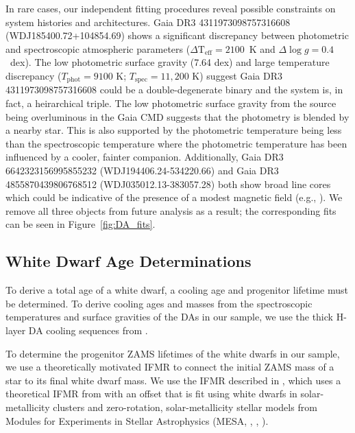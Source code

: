 \documentclass[twocolumn]{aastex631}
\newcommand{\logg}{$\log{g}$}
\begin{document}
In rare cases, our independent fitting procedures reveal possible constraints on system histories and architectures. Gaia DR3 4311973098757316608 (WDJ185400.72+104854.69) shows a significant discrepancy between photometric and spectroscopic atmospheric parameters ($\Delta \mathrm{T_{eff}} = 2100$~K and $\Delta$\logg $= 0.4$~dex). The low photometric surface gravity (7.64 dex) and large temperature discrepancy ($T_{\mathrm{phot}} = 9100$ K; $T_{\mathrm{spec}} = 11{,}200$ K) suggest Gaia DR3 4311973098757316608 could be a double-degenerate binary and the system is, in fact, a heirarchical triple. The low photometric surface gravity from the source being overluminous in the Gaia CMD suggests that the photometry is blended by a nearby star. This is also supported by the photometric temperature being less than the spectroscopic temperature where the photometric temperature has been influenced by a cooler, fainter companion. Additionally, Gaia DR3 6642323156995855232 (WDJ194406.24-534220.66) and Gaia DR3 4855870439806768512 (WDJ035012.13-383057.28) both show broad line cores which could be indicative of the presence of a modest magnetic field (e.g., \citealt{1998AA...338..612K}). We remove all three objects from future analysis as a result; the corresponding fits can be seen in Figure~\ref{fig:DA_fits}.

\subsection{White Dwarf Age Determinations}\label{sec:tot_age_determ}
To derive a total age of a white dwarf, a cooling age and progenitor lifetime must be determined. To derive cooling ages and masses from the spectroscopic temperatures and surface gravities of the DAs in our sample, we use the thick H-layer DA cooling sequences from \citet{2020ApJ...901...93B}.

To determine the progenitor ZAMS lifetimes of the white dwarfs in our sample, we use a theoretically motivated IFMR to connect the initial ZAMS mass of a star to its final white dwarf mass. We use the IFMR described in \cite{2022ApJ...934..148H}, which uses a theoretical IFMR from \cite{2016ApJ...823...46F} with an offset that is fit using white dwarfs in solar-metallicity clusters \citep{2008MNRAS.387.1693C, 2015ApJ...807...90C,2016ApJ...818...84C} and zero-rotation, solar-metallicity stellar models from Modules for Experiments in Stellar Astrophysics (MESA, \citealt{2011ApJS..192....3P}, \citealt{2013ApJS..208....4P}, \citealt{2015ApJS..220...15P}).
\end{document}
